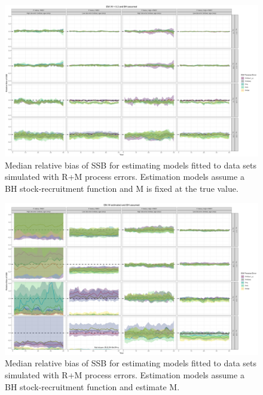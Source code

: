 \documentclass[
  12pt,
]{article}
\begin{document}
\begin{landscape}
\begin{figure}
\caption{Median relative bias of SSB for estimating models fitted to data sets simulated with R+M process errors. Estimation models assume a BH stock-recruitment function and M is fixed at the true value.}\label{M_om_em_BH_MF_relbias_ssb}
\begin{center}
\includegraphics[width = \textwidth]{M_om_BH_MF_relbias_ssb.png}
\end{center}
\end{figure}
\end{landscape}

\begin{landscape}
\begin{figure}
\caption{Median relative bias of SSB for estimating models fitted to data sets simulated with R+M process errors. Estimation models assume a BH stock-recruitment function and estimate M.}\label{M_om_em_BH_ME_relbias_ssb}
\begin{center}
\includegraphics[width = \textwidth]{M_om_BH_ME_relbias_ssb.png}
\end{center}
\end{figure}
\end{landscape}
\end{document}
